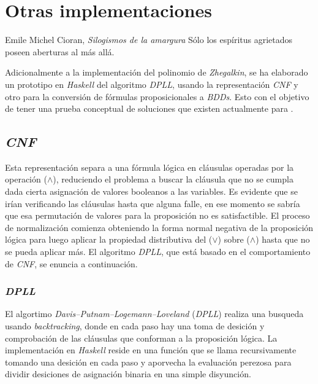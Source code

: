 \chapter{Otras implementaciones}

\begin{chapquote}{Emile Michel Cioran, \textit{Silogismos de la amargura}}
Sólo los espíritus agrietados poseen aberturas al más allá.
\end{chapquote}

Adicionalmente a la implementación del polinomio de \textit{Zhegalkin}, se ha elaborado un prototipo en \textit{Haskell} del algoritmo \textit{DPLL}, usando la representación \textit{CNF} y otro para la conversión de fórmulas proposicionales a \textit{BDDs}. Esto con el objetivo de tener una prueba conceptual de soluciones que existen actualmente para \sat.

\section{\textit{CNF}}

Esta representación separa a una fórmula lógica en cláusulas operadas por la operación ($\land$), reduciendo el problema \sat a buscar la cláusula que no se cumpla dada cierta asignación de valores booleanos a las variables. Es evidente que se irían verificando las cláusulas hasta que alguna falle, en ese momento se sabría que esa permutación de valores para la proposición no es satisfactible. El proceso de normalización comienza obteniendo la forma normal negativa de la proposición lógica para luego aplicar la propiedad distributiva del ($\lor$) sobre ($\land$) hasta que no se pueda aplicar más. El algoritmo \textit{DPLL}, que está basado en el comportamiento de \textit{CNF}, se enuncia a continuación.

\subsection{\textit{DPLL}}

El algortimo \textit{Davis–Putnam–Logemann–Loveland} (\textit{DPLL}) realiza una busqueda usando \textit{backtracking}, donde en cada paso hay una toma de desición y comprobación de las cláusulas que conforman a la proposición lógica. La implementación en \textit{Haskell} reside en una función que se llama recursivamente tomando una desición en cada paso y aporvecha la evaluación perezosa para dividir desiciones de asignación binaria en una simple disyunción.

